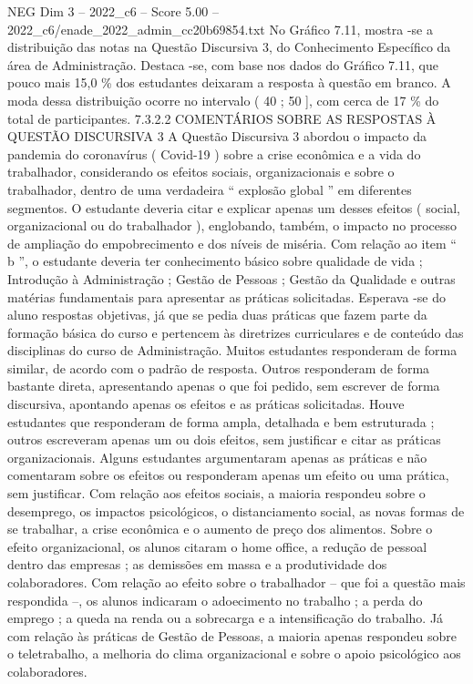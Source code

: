 \begin{textsample}{NEG Dim 3 – 2022\_c6 – Score 5.00 – 2022\_c6/enade\_2022\_admin\_cc20b69854.txt}
No Gráfico 7.11, mostra -se a distribuição das notas na Questão Discursiva 3, do Conhecimento Específico da área de Administração.
Destaca -se, com base nos dados do Gráfico 7.11, que pouco mais 15,0 \% dos estudantes deixaram a resposta à questão em branco.
A moda dessa distribuição ocorre no intervalo ( 40 ; 50 ], com cerca de 17 \% do total de participantes. 7.3.2.2 COMENTÁRIOS SOBRE AS RESPOSTAS À QUESTÃO DISCURSIVA 3 A Questão Discursiva 3 abordou o impacto da pandemia do coronavírus ( Covid-19 ) sobre a crise econômica e a vida do trabalhador, considerando os efeitos sociais, organizacionais e sobre o trabalhador, dentro de uma verdadeira “ explosão global ” em diferentes segmentos.
O estudante deveria citar e explicar apenas um desses efeitos ( social, organizacional ou do trabalhador ), englobando, também, o impacto no processo de ampliação do empobrecimento e dos níveis de miséria.
Com relação ao item “ b ”, o estudante deveria ter conhecimento básico sobre qualidade de vida ; Introdução à Administração ; Gestão de Pessoas ; Gestão da Qualidade e outras matérias fundamentais para apresentar as práticas solicitadas.
Esperava -se do aluno respostas objetivas, já que se pedia duas práticas que fazem parte da formação básica do curso e pertencem às diretrizes curriculares e de conteúdo das disciplinas do curso de Administração.
Muitos estudantes responderam de forma similar, de acordo com o padrão de resposta.
Outros responderam de forma bastante direta, apresentando apenas o que foi pedido, sem escrever de forma discursiva, apontando apenas os efeitos e as práticas solicitadas.
Houve estudantes que responderam de forma ampla, detalhada e bem estruturada ; outros escreveram apenas um ou dois efeitos, sem justificar e citar as práticas organizacionais.
Alguns estudantes argumentaram apenas as práticas e não comentaram sobre os efeitos ou responderam apenas um efeito ou uma prática, sem justificar.
Com relação aos efeitos sociais, a maioria respondeu sobre o desemprego, os impactos psicológicos, o distanciamento social, as novas formas de se trabalhar, a crise econômica e o aumento de preço dos alimentos.
Sobre o efeito organizacional, os alunos citaram o home office, a redução de pessoal dentro das empresas ; as demissões em massa e a produtividade dos colaboradores.
Com relação ao efeito sobre o trabalhador – que foi a questão mais respondida –, os alunos indicaram o adoecimento no trabalho ; a perda do emprego ; a queda na renda ou a sobrecarga e a intensificação do trabalho.
Já com relação às práticas de Gestão de Pessoas, a maioria apenas respondeu sobre o teletrabalho, a melhoria do clima organizacional e sobre o apoio psicológico aos colaboradores.

\end{textsample}
